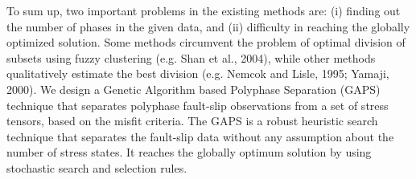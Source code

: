 To sum up, two important problems in the existing methods are: (i) finding out the number of phases in the given data, and (ii) difficulty in reaching the globally optimized solution. Some methods circumvent the problem of optimal division of subsets using fuzzy clustering (e.g. Shan et al., 2004), while other methods qualitatively estimate the best division (e.g. Nemcok and Lisle, 1995; Yamaji, 2000).
We design a Genetic Algorithm based Polyphase Separation (GAPS) technique that separates polyphase fault-slip observations from a set of stress tensors, based on the misfit criteria. The GAPS is a robust heuristic search technique that separates the fault-slip data without any assumption about the number of stress states. It reaches the globally optimum solution by using stochastic search and selection rules.
